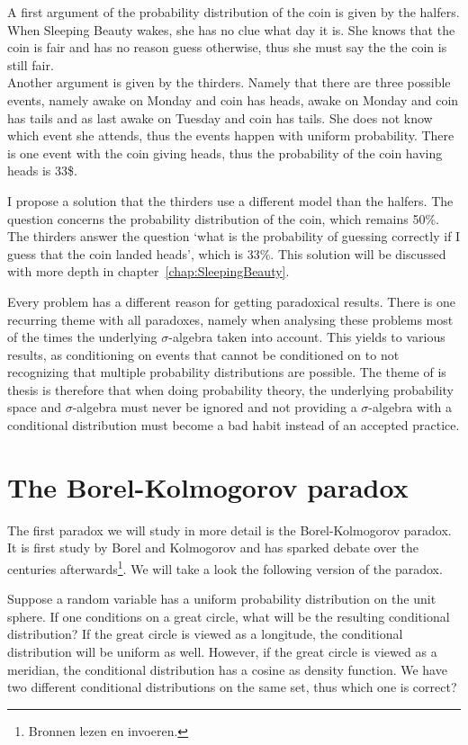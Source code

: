\documentclass[twoside,a4paper]{report}
\theoremstyle{plain}
\theoremstyle{definition}
\theoremstyle{remark}
\numberwithin{equation}{chapter}
\DeclareMathOperator{\1}{\mathbbm{1}}
\begin{document}
A first argument of the probability distribution of the coin is given by the halfers. When Sleeping Beauty wakes, she has no clue what day it is. She knows that the coin is fair and has no reason guess otherwise, thus she must say the the coin is still fair.\\
Another argument is given by the thirders. Namely that there are three possible events, namely awake on Monday and coin has heads, awake on Monday and coin has tails and as last awake on Tuesday and coin has tails. She does not know which event she attends, thus the events happen with uniform probability. There is one event with the coin giving heads, thus the probability of the coin having heads is 33\$.

I propose a solution that the thirders use a different model than the halfers. The question concerns the probability distribution of the coin, which remains 50\%. The thirders answer the question `what is the probability of guessing correctly if I guess that the coin landed heads', which is 33\%. This solution will be discussed with more depth in chapter~\ref{chap:SleepingBeauty}.

Every problem has a different reason for getting paradoxical results. There is one recurring theme with all paradoxes, namely when analysing these problems most of the times the underlying $\sigma$-algebra taken into account. This yields to various results, as conditioning on events that cannot be conditioned on to not recognizing that multiple probability distributions are possible. The theme of is thesis is therefore that when doing probability theory, the underlying probability space and $\sigma$-algebra must never be ignored and not providing a $\sigma$-algebra with a conditional distribution must become a bad habit instead of an accepted practice.

\chapter{The Borel-Kolmogorov paradox}\label{chap:BorelKolmogorov}
The first paradox we will study in more detail is the Borel-Kolmogorov paradox. It is first study by Borel \cite{Borel09} and Kolmogorov \cite{Kolmogorov33} and has sparked debate over the centuries afterwards\footnote{Bronnen lezen en invoeren.}. We will take a look the following version of the paradox.

Suppose a random variable has a uniform probability distribution on the unit sphere. If one conditions on a great circle, what will be the resulting conditional distribution? If the great circle is viewed as a longitude, the conditional distribution will be uniform as well. However, if the great circle is viewed as a meridian, the conditional distribution has a cosine as density function. We have two different conditional distributions on the same set, thus which one is correct?
\end{document}
